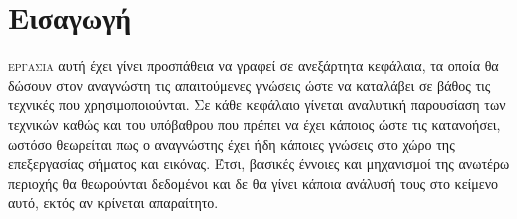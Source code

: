 
\chapter*{Εισαγωγή}
\lettrine[findent=2pt]{}{εργασια} αυτή έχει γίνει προσπάθεια να γραφεί σε ανεξάρτητα κεφάλαια, τα οποία θα δώσουν στον αναγνώστη τις απαιτούμενες γνώσεις ώστε να καταλάβει σε βάθος τις τεχνικές που χρησιμοποιούνται. Σε κάθε κεφάλαιο γίνεται αναλυτική παρουσίαση των τεχνικών καθώς και του υπόβαθρου που πρέπει να έχει κάποιος ώστε τις κατανοήσει, ωστόσο θεωρείται πως ο αναγνώστης έχει ήδη κάποιες γνώσεις στο χώρο της επεξεργασίας σήματος και εικόνας. Έτσι, βασικές έννοιες και μηχανισμοί της ανωτέρω περιοχής θα θεωρούνται δεδομένοι και δε θα γίνει κάποια ανάλυσή τους στο κείμενο αυτό, εκτός αν κρίνεται απαραίτητο.
